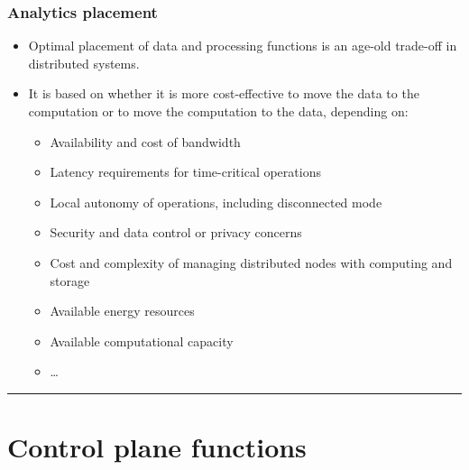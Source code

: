 \documentclass[
]{article}
\providecommand{\tightlist}{%
  \setlength{\itemsep}{0pt}\setlength{\parskip}{0pt}}
\begin{document}
\subsubsection{Analytics placement}\label{analytics-placement}

\begin{itemize}
\tightlist
\item
  Optimal placement of data and processing functions is an age-old
  trade-off in distributed systems.
\item
  It is based on whether it is more cost-effective to move the data to
  the computation or to move the computation to the data, depending on:

  \begin{itemize}
  \tightlist
  \item
    Availability and cost of bandwidth
  \item
    Latency requirements for time-critical operations
  \item
    Local autonomy of operations, including disconnected mode
  \item
    Security and data control or privacy concerns
  \item
    Cost and complexity of managing distributed nodes with computing and
    storage
  \item
    Available energy resources
  \item
    Available computational capacity
  \item
    \ldots{}
  \end{itemize}
\end{itemize}

\begin{center}\rule{0.5\linewidth}{0.5pt}\end{center}

\section{Control plane functions}\label{control-plane-functions}
\end{document}
